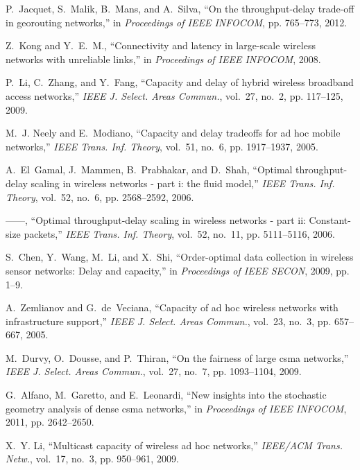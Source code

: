 \documentclass[english]{IEEEtran}
\theoremstyle{plain}
\theoremstyle{plain}
\theoremstyle{plain}
\theoremstyle{remark}
\begin{document}
\begin{thebibliography}{10}
P.~Jacquet, S.~Malik, B.~Mans, and A.~Silva, ``On the throughput-delay
  trade-off in georouting networks,'' in \emph{Proceedings of IEEE INFOCOM},
  pp. 765--773, 2012.

Z.~Kong and Y.~E.~M., ``Connectivity and latency in large-scale wireless
  networks with unreliable links,'' in \emph{Proceedings of IEEE INFOCOM},
  2008.

P.~Li, C.~Zhang, and Y.~Fang, ``Capacity and delay of hybrid wireless broadband
  access networks,'' \emph{IEEE J. Select. Areas Commun.}, vol.~27, no.~2, pp.
  117--125, 2009.

M.~J. Neely and E.~Modiano, ``Capacity and delay tradeoffs for ad hoc mobile
  networks,'' \emph{IEEE Trans. Inf. Theory}, vol.~51, no.~6, pp. 1917--1937,
  2005.

A.~El~Gamal, J.~Mammen, B.~Prabhakar, and D.~Shah, ``Optimal throughput-delay
  scaling in wireless networks - part i: the fluid model,'' \emph{IEEE Trans.
  Inf. Theory}, vol.~52, no.~6, pp. 2568--2592, 2006.

------, ``Optimal throughput-delay scaling in wireless networks - part ii:
  Constant-size packets,'' \emph{IEEE Trans. Inf. Theory}, vol.~52, no.~11, pp.
  5111--5116, 2006.

S.~Chen, Y.~Wang, M.~Li, and X.~Shi, ``Order-optimal data collection in
  wireless sensor networks: Delay and capacity,'' in \emph{Proceedings of IEEE
  SECON}, 2009, pp. 1--9.

A.~Zemlianov and G.~de~Veciana, ``Capacity of ad hoc wireless networks with
  infrastructure support,'' \emph{IEEE J. Select. Areas Commun.}, vol.~23,
  no.~3, pp. 657--667, 2005.

M.~Durvy, O.~Dousse, and P.~Thiran, ``On the fairness of large csma networks,''
  \emph{IEEE J. Select. Areas Commun.}, vol.~27, no.~7, pp. 1093--1104, 2009.

G.~Alfano, M.~Garetto, and E.~Leonardi, ``New insights into the stochastic
  geometry analysis of dense csma networks,'' in \emph{Proceedings of IEEE
  INFOCOM}, 2011, pp. 2642--2650.

X.~Y. Li, ``Multicast capacity of wireless ad hoc networks,'' \emph{IEEE/ACM
  Trans. Netw.}, vol.~17, no.~3, pp. 950--961, 2009.


\end{thebibliography}
\end{document}
